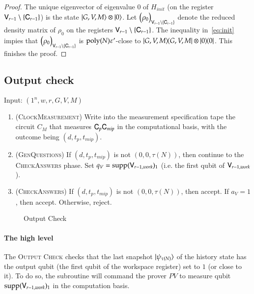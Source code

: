\begin{proof}
	The unique eigenvector of eigenvalue $0$ of $H_{init}$ (on the register ${\mathsf{V}}_{r-1} \setminus \{ {\mathsf{C}}_{r-1} \}$) is the state $|G,V,M\rangle \otimes |0\rangle$. Let $\Big( \rho_0 \Big)_{{\mathsf{V}}_{r-1} \setminus \{ {\mathsf{C}}_{r-1} \}}$ denote the reduced density matrix of $\rho_0$ on the registers ${\mathsf{V}}_{r-1} \setminus \{ {\mathsf{C}}_{r-1} \}$. The inequality in~\eqref{eq:init} impies that $\Big( \rho_0 \Big)_{{\mathsf{V}}_{r-1} \setminus \{ {\mathsf{C}}_{r-1} \}}$ is $\operatorname{poly}(N) \varepsilon'$-close to $|G,V,M\rangle\! \langle G,V,M| \otimes |0\rangle\! \langle 0|$. This finishes the proof.
\end{proof}

\subsection{Output check}
\label{sec:output_check}


\vspace{10pt}
\begin{center}
\begin{mdframed}
    Input: $(1^n,w,r,G,V,M)$
	\begin{enumerate}
		\item (\textsc{ClockMeasurement}) Write into the measurement specification tape the circuit $C_M$ that measures ${\mathsf{C}}_p {\mathsf{C}}_{mip}$ in the computational basis, with the outcome being $(d,t_p,t_{mip})$.
		
		\item (\textsc{GenQuestions}) If $(d,t_p,t_{mip})$ is not $(0,0,\tau(N))$, then continue to the \textsc{CheckAnswers} phase. Set $q_V = \operatorname{supp}({\mathsf{V}}_{r-1,work})_1$ (i.e. the first qubit of ${\mathsf{V}}_{r-1,work}$).
		\item (\textsc{CheckAnswers}) If $(d,t_p,t_{mip})$ is not $(0,0,\tau(N))$, then accept. If $a_V = 1$, then accept. Otherwise, reject.
	\end{enumerate}    
\end{mdframed}
\end{center}
\begin{figure}[H]
\caption{Output Check}
\label{fig:output_check}
\end{figure}


\paragraph{The high level} The \textsc{Output Check} checks that the last snapshot $|\psi_{\tau(N)}\rangle$ of the history state has the output qubit (the first qubit of the workspace register) set to $1$ (or close to it). To do so, the subroutine will command the prover $PV$ to measure  qubit $\operatorname{supp}({\mathsf{V}}_{r-1,work})_1$ in the computation basis. 

